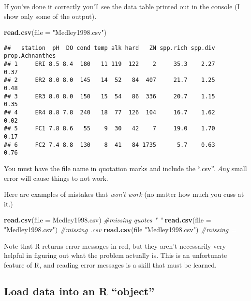\documentclass[]{book}
\newenvironment{Shaded}{\begin{snugshade}}{\end{snugshade}}
\newcommand{\KeywordTok}[1]{\textcolor[rgb]{0.13,0.29,0.53}{\textbf{#1}}}
\newcommand{\DataTypeTok}[1]{\textcolor[rgb]{0.13,0.29,0.53}{#1}}
\newcommand{\StringTok}[1]{\textcolor[rgb]{0.31,0.60,0.02}{#1}}
\newcommand{\CommentTok}[1]{\textcolor[rgb]{0.56,0.35,0.01}{\textit{#1}}}
\newcommand{\NormalTok}[1]{#1}
\theoremstyle{definition}
\theoremstyle{definition}
\theoremstyle{definition}
\theoremstyle{remark}
\begin{document}
If you've done it correctly you'll see the data table printed out in the
console (I show only some of the output).

\begin{Shaded}
\begin{Highlighting}[]
\KeywordTok{read.csv}\NormalTok{(}\DataTypeTok{file =} \StringTok{"Medley1998.csv"}\NormalTok{)}
\end{Highlighting}
\end{Shaded}

\begin{verbatim}
##   station  pH  DO cond temp alk hard   ZN spp.rich spp.div prop.Achnanthes
## 1     ERI 8.5 8.4  180   11 119  122    2     35.3    2.27            0.37
## 2     ER2 8.0 8.0  145   14  52   84  407     21.7    1.25            0.48
## 3     ER3 8.0 8.0  150   15  54   86  336     20.7    1.15            0.35
## 4     ER4 8.8 7.8  240   18  77  126  104     16.7    1.62            0.02
## 5     FC1 7.8 8.6   55    9  30   42    7     19.0    1.70            0.17
## 6     FC2 7.4 8.8  130    8  41   84 1735      5.7    0.63            0.76
\end{verbatim}

You must have the file name in quotation marks and include the ``.csv''.
\emph{Any} small error will cause things to not work.

Here are examples of mistakes that \emph{won't work} (no matter how much
you cuss at it.)

\begin{Shaded}
\begin{Highlighting}[]
\KeywordTok{read.csv}\NormalTok{(}\DataTypeTok{file =}\NormalTok{ Medley1998.csv)     }\CommentTok{#missing quotes " "}
\KeywordTok{read.csv}\NormalTok{(}\DataTypeTok{file =} \StringTok{"Medley1998.csv"}\NormalTok{)   }\CommentTok{#missing .csv}
\KeywordTok{read.csv}\NormalTok{(file }\StringTok{"Medley1998.csv"}\NormalTok{)     }\CommentTok{#missing =}
\end{Highlighting}
\end{Shaded}

Note that R returns error messages in red, but they aren't necessarily
very helpful in figuring out what the problem actually is. This is an
unfortunate feature of R, and reading error messages is a skill that
must be learned.

\subsection{\texorpdfstring{Load data into an R
``object''}{Load data into an R object}}\label{load-data-into-an-r-object}
\end{document}
